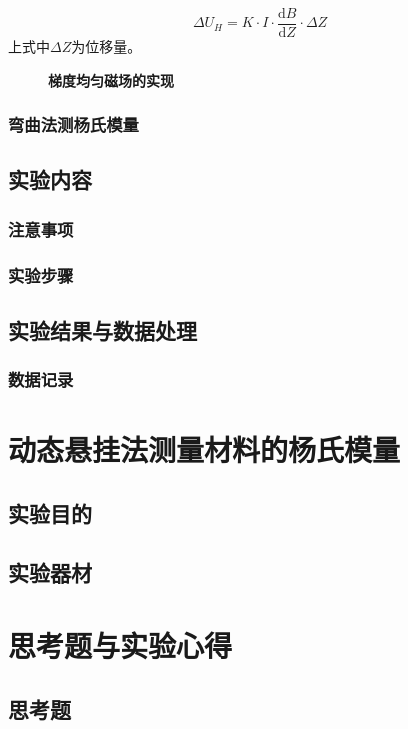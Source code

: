 \documentclass[zihao=5, UTF8]{article}
\theoremstyle{MyLineTheoremStyle} %
\theoremstyle{MyBlockTheoremStyle} %
\theoremstyle{MySubsubsectionStyle} %
\begin{document}
\begin{equation}
    \Delta U_H=K\cdot I\cdot\frac{\mathrm{d} B}{\mathrm{d} Z}\cdot\Delta Z
\end{equation}
上式中$ \Delta Z $为位移量。

\begin{figure}[H]
    \centering
    
    \caption{\textbf{梯度均匀磁场的实现}}\label{梯度均匀磁场的实现}
\end{figure}

\subsubsection{弯曲法测杨氏模量}

\subsection{实验内容}
\subsubsection{注意事项}
\subsubsection{实验步骤}
\subsection{实验结果与数据处理}
\subsubsection{数据记录}

\newpage
\section{动态悬挂法测量材料的杨氏模量}
\subsection{实验目的}
\subsection{实验器材}

\newpage
\section{思考题与实验心得}
\subsection{思考题}
\end{document}
